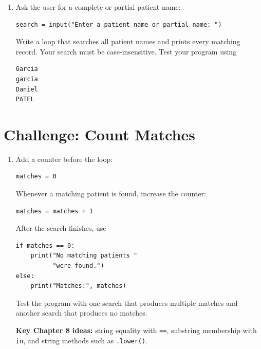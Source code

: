 \documentclass{article}
\begin{document}
\begin{enumerate}

\item Ask the user for a complete or partial patient name:

\begin{verbatim}
search = input("Enter a patient name or partial name: ")
\end{verbatim}

Write a loop that searches all patient names and prints every matching record.  Your search must be case-insensitive. Test your program using

\begin{verbatim}
Garcia
garcia
Daniel
PATEL
\end{verbatim}

\end{enumerate}


\section{Challenge: Count Matches}

\begin{enumerate}

\item Add a counter before the loop:

\begin{verbatim}
matches = 0
\end{verbatim}

Whenever a matching patient is found, increase the counter:

\begin{verbatim}
matches = matches + 1
\end{verbatim}

After the search finishes, use

\begin{verbatim}
if matches == 0:
    print("No matching patients "
          "were found.")
else:
    print("Matches:", matches)
\end{verbatim}

Test the program with one search that produces multiple matches
and another search that produces no matches.

\vspace{0.15cm}

\textbf{Key Chapter 8 ideas:}
string equality with \texttt{==}, substring membership with
\texttt{in}, and string methods such as \texttt{.lower()}.

\end{enumerate}
\end{document}
